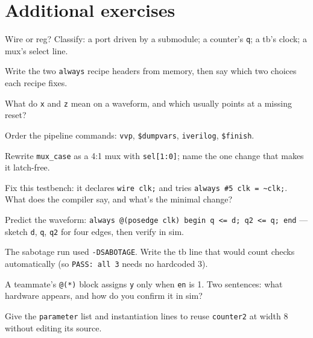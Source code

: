 \section*{Additional exercises}

\begin{exercise}[easy]
Wire or reg? Classify: a port driven by a submodule; a counter's
\texttt{q}; a tb's clock; a mux's select line.
\end{exercise}
\begin{exercise}[easy]
Write the two \texttt{always} recipe headers from memory, then say
which two choices each recipe fixes.
\end{exercise}
\begin{exercise}[easy]
What do \texttt{x} and \texttt{z} mean on a waveform, and which usually
points at a missing reset?
\end{exercise}
\begin{exercise}[easy]
Order the pipeline commands: \texttt{vvp}, \texttt{\$dumpvars},
\texttt{iverilog}, \texttt{\$finish}.
\end{exercise}
\begin{exercise}[medium]
Rewrite \texttt{mux\_case} as a 4:1 mux with \texttt{sel[1:0]}; name
the one change that makes it latch-free.
\end{exercise}
\begin{exercise}[medium]
Fix this testbench: it declares \texttt{wire clk;} and tries
\texttt{always \#5 clk = \textasciitilde clk;}. What does the compiler
say, and what's the minimal change?
\end{exercise}
\begin{exercise}[medium]
Predict the waveform: \texttt{always @(posedge clk) begin q <= d;
q2 <= q; end} --- sketch \texttt{d}, \texttt{q}, \texttt{q2} for four
edges, then verify in sim.
\end{exercise}
\begin{exercise}[medium]
The sabotage run used \texttt{-DSABOTAGE}. Write the tb line that would
count checks automatically (so \texttt{PASS: all 3} needs no hardcoded
3).
\end{exercise}
\begin{exercise}[medium]
A teammate's \texttt{@(*)} block assigns \texttt{y} only when
\texttt{en} is 1. Two sentences: what hardware appears, and how do you
confirm it in sim?
\end{exercise}
\begin{exercise}[medium]
Give the \texttt{parameter} list and instantiation lines to reuse
\texttt{counter2} at width 8 without editing its source.
\end{exercise}
